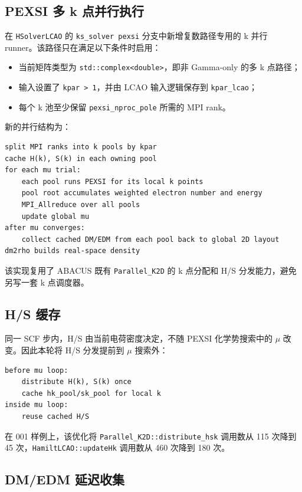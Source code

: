 \documentclass[a4paper,11pt]{article}
\newcommand{\code}[1]{\texttt{#1}}
\begin{document}
\subsection{PEXSI 多 k 点并行执行}

在 \code{HSolverLCAO} 的 \code{ks\_solver pexsi} 分支中新增复数路径专用的 k 并行 runner。该路径只在满足以下条件时启用：

\begin{itemize}
    \item 当前矩阵类型为 \code{std::complex<double>}，即非 Gamma-only 的多 k 点路径；
    \item 输入设置了 \code{kpar > 1}，并由 LCAO 输入逻辑保存到 \code{kpar\_lcao}；
    \item 每个 k 池至少保留 \code{pexsi\_nproc\_pole} 所需的 MPI rank。
\end{itemize}

新的并行结构为：

\begin{verbatim}
split MPI ranks into k pools by kpar
cache H(k), S(k) in each owning pool
for each mu trial:
    each pool runs PEXSI for its local k points
    pool root accumulates weighted electron number and energy
    MPI_Allreduce over all pools
    update global mu
after mu converges:
    collect cached DM/EDM from each pool back to global 2D layout
dm2rho builds real-space density
\end{verbatim}

该实现复用了 ABACUS 既有 \code{Parallel\_K2D} 的 k 点分配和 H/S 分发能力，避免另写一套 k 点调度器。

\subsection{H/S 缓存}

同一 SCF 步内，H/S 由当前电荷密度决定，不随 PEXSI 化学势搜索中的 \(\mu\) 改变。因此本轮将 H/S 分发提前到 \(\mu\) 搜索外：

\begin{verbatim}
before mu loop:
    distribute H(k), S(k) once
    cache hk_pool/sk_pool for local k
inside mu loop:
    reuse cached H/S
\end{verbatim}

在 001 样例上，该优化将 \code{Parallel\_K2D::distribute\_hsk} 调用数从 115 次降到 45 次，\code{HamiltLCAO::updateHk} 调用数从 460 次降到 180 次。

\subsection{DM/EDM 延迟收集}
\end{document}
